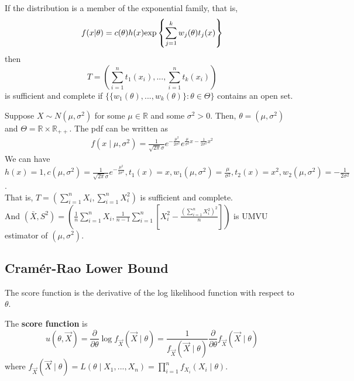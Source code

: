 \documentclass[11pt]{elegantbook}
\begin{document}
\begin{theorem}\label{comp_exp_fam}
    If the distribution is a member of the exponential family, that is, $$f(x|\theta)=c(\theta)h(x)\textnormal{exp}\left\{\sum_{j=1}^k w_j(\theta) t_j(x)\right\}$$ then $$T=\left(\sum_{i=1}^n t_1(x_i),...,\sum_{i=1}^n t_k(x_i)\right)$$ is sufficient and complete if $\{\{w_1(\theta),...,w_k(\theta)\}:\theta\in\Theta\}$ contains an open set.
\end{theorem}
\begin{example}
    Suppose $X\sim N(\mu,\sigma^2)$ for some $\mu\in \mathbb{R}$ and some $\sigma^2>0$. Then, $\theta=(\mu,\sigma^2)$ and $\Theta=\mathbb{R}\times \mathbb{R}_{++}$. The pdf can be written as
    \begin{equation}
        \begin{aligned}
            f(x\mid \mu,\sigma^2)=\frac{1}{\sqrt{2\pi}\sigma}e^{-\frac{\mu^2}{2\sigma^2}}e^{\frac{\mu}{\sigma^2}x-\frac{1}{2\sigma^2}x^2}
        \end{aligned}
        \nonumber
    \end{equation}
    We can have $h(x)=1, c(\mu,\sigma^2)=\frac{1}{\sqrt{2\pi}\sigma}e^{-\frac{\mu^2}{2\sigma^2}}, t_1(x)=x, w_1(\mu,\sigma^2)=\frac{\mu}{\sigma^2}, t_2(x)=x^2, w_2(\mu,\sigma^2)=-\frac{1}{2\sigma^2}$.\\
    That is, $T=\left(\sum_{i=1}^n X_i, \sum_{i=1}^n X_i^2\right)$ is sufficient and complete.\\
    And $\left(\bar{X},S^2\right)=\left(\frac{1}{n}\sum_{i=1}^n X_i,\frac{1}{n-1}\sum_{i=1}^n\left[X_i^2-\frac{(\sum_{i=1}^n X_i^2)^2}{n}\right]\right)$ is UMVU estimator of $(\mu,\sigma^2)$.
\end{example}


\subsection{Cramér-Rao Lower Bound}
The score function is the derivative of the log likelihood function with respect to $\theta$.
\begin{definition}
    \normalfont
    The \textbf{score function} is $$u(\theta,\vec{X})=\frac{\partial}{\partial \theta}\log f_{\vec{X}}(\vec{X}\mid\theta)=\frac{1}{f_{\vec{X}}(\vec{X}\mid\theta)}\frac{\partial}{\partial \theta}f_{\vec{X}}(\vec{X}\mid\theta)$$
    where $f_{\vec{X}}(\vec{X}\mid\theta)=L(\theta\mid X_1,...,X_n)=\prod_{i=1}^n f_{X_i}(X_i\mid\theta)$.
\end{definition}
\end{document}
